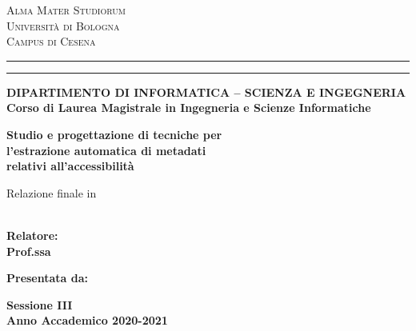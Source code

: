 
\oddsidemargin=25pt

\begin{titlepage}
\begin{center}
{{\Large{\textsc{Alma Mater Studiorum}}}\\
{\Large{\textsc{Universit\`a di Bologna}}} \\
{\textsc{Campus di Cesena}}} \rule[0.1cm]{14cm}{0.1mm}
		\rule[0.5cm]{14cm}{0.6mm}
{\small{\bf DIPARTIMENTO DI INFORMATICA – SCIENZA E INGEGNERIA\\
Corso di Laurea Magistrale in Ingegneria e Scienze Informatiche }}
\end{center}
\vspace{15mm}
\begin{center}
{\LARGE{\bf Studio e progettazione di tecniche per}}\\
\vspace{2mm}
{\LARGE{\bf l'estrazione automatica di metadati}}\\
\vspace{2mm}
{\LARGE{\bf relativi all'accessibilità}}\\
\end{center}
\vspace{3mm}
\begin{center}
{Relazione finale in}\\
\vspace{2mm}
{\bf \xsubject}\\
\end{center}
\vspace{20mm}
\par
\noindent
\begin{minipage}[t]{0.5\textwidth}
{\large{\bf Relatore:\\
Prof.ssa \xsupervisor}} \\
\end{minipage}
\hfill
\begin{minipage}[t]{0.47\textwidth}\raggedleft
{\large{\bf Presentata da:\\
\xstudent}}
\end{minipage}
\vspace{30mm}
\begin{center}
{\large{\bf Sessione III\\%
Anno Accademico 2020-2021}}%
\end{center}

\newpage
\clearpage{\pagestyle{empty}\cleardoublepage}
\end{titlepage}

